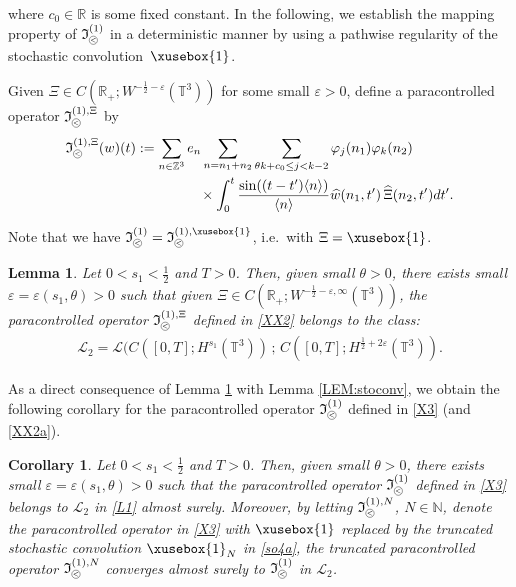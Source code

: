 \documentclass[%
11pt,  reqno]{amsart}
\def\<#1>{\xusebox{#1}}
\newcommand{\pl}{\mathbin{\scaleobj{0.7}{\tikz \draw (0,0) node[shape=circle,draw,inner sep=0pt,minimum size=8.5pt] {\scriptsize $<$};}}}
\newtheorem{lemma}[theorem]{Lemma}
\newtheorem{corollary}[theorem]{Corollary}
\newcommand{\1}{\hspace{0.2mm}\text{I}\hspace{0.2mm}}
\newcommand{\noi}{\noindent}
\newcommand{\Z}{\mathbb{Z}}
\newcommand{\R}{\mathbb{R}}
\newcommand{\T}{\mathbb{T}}
\renewcommand{\L}{\mathcal{L}}
\newcommand{\eps}{\varepsilon}
\newcommand{\ft}{\widehat}
\newcommand{\ta}{\theta}
\newcommand{\jb}[1]
{\langle #1 \rangle}
\newcommand{\N}{\mathbb{N}}
\newcommand{\If}{\mathfrak{I}}
\numberwithin{equation}{section}
\numberwithin{theorem}{section}
\begin{document}
\noi
where $c_0 \in \R$ is some fixed constant.
In the following, we establish
the mapping property of 
$\If_{\pl}^{(1)}$ in a deterministic manner
by using a pathwise regularity of the stochastic convolution~$\<1>$.

Given $\Xi  \in C(\R_+; W^{-\frac 12 -\eps}(\T^3))$ for some small $\eps > 0$, 
define a paracontrolled operator  $\If_{\pl}^{(1), \Xi}$ by 
\begin{align}
\begin{split}
 \If_{\pl}^{(1), \Xi} (w) (t)
 &  : =  \sum_{n \in \Z^3}
e_n  \sum_{n =  n_1 +  n_2}
\sum_{ \ta k + c_0 \leq j < k-2}
\varphi_j(n_1) \varphi_k(n_2)  \\
& \hphantom{XXXXX}
\times 
\int_0^t \frac{\sin ((t - t') \jb{n})}{\jb{n}} 
\ft w(n_1, t')\,  \ft{ \Xi}(n_2, t') dt'.
\end{split}
\label{XX2}
\end{align}





\noi
Note that we have $\If_{\pl}^{(1)} = \If_{\pl}^{(1), \<1>}$, 
i.e.~with $\Xi = \<1>$. 

\begin{lemma}\label{LEM:sto3}
Let  $0 < s_1 < \frac 12$ and $T > 0$.
Then, given small $\theta > 0$, 
there exists small $\eps = \eps(s_1, \ta) > 0$
such that 
given $\Xi  \in C(\R_+; W^{-\frac 12 -\eps, \infty}(\T^3))$, 
the paracontrolled operator $ \If_{\pl}^{(1), \Xi}$ defined in \eqref{XX2} belongs to the class: 
\begin{align}
 \L_2 = \L( C([0, T]; H^{s_1}(\T^3) )
 \, ; \, 
C([0, T]; H^{\frac 12 + 2\eps}(\T^3) ).
\label{L1}
\end{align}


\end{lemma}

As a direct consequence of Lemma \ref{LEM:sto3}
with Lemma \ref{LEM:stoconv}, 
we obtain the following corollary for the paracontrolled operator
$\If_{\pl}^{(1)}$ defined in \eqref{X3} (and \eqref{XX2a}).

\begin{corollary}\label{COR:sto3a}
Let  $0 < s_1 < \frac 12$ and $T > 0$.
Then, given small $\theta > 0$, 
there exists small $\eps= \eps(s_1, \ta)  > 0$
such that 
the paracontrolled operator $ \If_{\pl}^{(1)}$ defined in \eqref{X3} belongs 
to $\L_2$ in \eqref{L1}
almost surely.
Moreover, by letting
$ \If_{\pl}^{(1), N}$, $N \in \N$, denote the paracontrolled operator
in \eqref{X3} with $\<1>$ replaced by the truncated stochastic convolution $\<1>_N$ in \eqref{so4a}, 
the truncated paracontrolled operator $ \If_{\pl}^{(1), N}$ converges almost surely to $ \If_{\pl}^{(1)}$ 
in $\L_2$.

\end{corollary}
\end{document}
